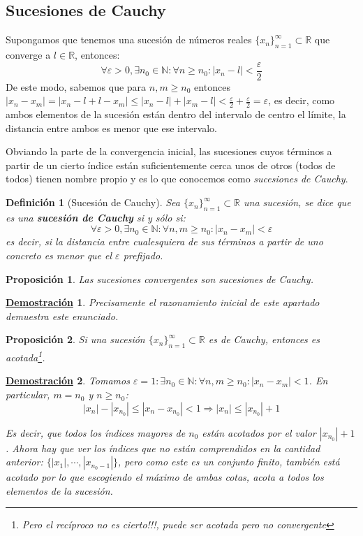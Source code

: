 \documentclass[10pt,a4paper,openright]{book}
\theoremstyle{break}
\newtheorem{defi}{Definición}[chapter]
\newtheorem{prop}{Proposición}[chapter]
\newtheorem*{demo}{\underline{Demostración}}
\begin{document}
\subsection{Sucesiones de Cauchy}
Supongamos que tenemos una sucesión de números reales $\{x_n\}_{n=1}^\infty\subset \mathbb R$ que converge a $l\in \mathbb R$, entonces:
$$\forall \varepsilon>0, \exists n_0\in \mathbb N: \forall n\geq n_0: |x_n-l|<\frac{\varepsilon}{2}$$
De este modo, sabemos que para $n,m\geq n_0$ entonces $|x_n-x_m|=|x_n-l+l-x_m|\leq |x_n-l|+|x_m-l|< \frac{\varepsilon}{2}+\frac{\varepsilon}{2}=\varepsilon$, es decir, como ambos elementos de la sucesión están dentro del intervalo de centro el límite, la distancia entre ambos es menor que ese intervalo.

Obviando la parte de la convergencia inicial, las sucesiones cuyos términos a partir de un cierto índice están suficientemente cerca unos de otros (todos de todos) tienen nombre propio y es lo que conocemos como \textit{sucesiones de Cauchy}.

\begin{defi}[Sucesión de Cauchy]
Sea $\{x_n\}_{n=1}^\infty\subset \mathbb R$ una sucesión, se dice que es una \textbf{sucesión de Cauchy} si y sólo si:
$$\forall \varepsilon>0, \exists n_0\in \mathbb N: \forall n,m\geq n_0: |x_n-x_m|<\varepsilon$$
es decir, si la distancia entre cualesquiera de sus términos a partir de uno concreto es menor que el $\varepsilon$ prefijado.
\end{defi}

\begin{prop}
Las sucesiones convergentes son sucesiones de Cauchy.
\end{prop}

\begin{demo}
Precisamente el razonamiento inicial de este apartado demuestra este enunciado.
\end{demo}

\begin{prop}
Si una sucesión $\{x_n\}_{n=1}^\infty\subset \mathbb R$ es de Cauchy, entonces es acotada\footnote{Pero el recíproco no es cierto!!!, puede ser acotada pero no convergente}.\par
\end{prop}
\begin{demo}
Tomamos $\varepsilon=1: \exists n_0\in \mathbb N: \forall n,m\geq n_0: |x_n-x_m|<1$. En particular, $m=n_0$ y $n\geq n_0$:
$$|x_n|-|x_{n_0}|\leq |x_n-x_{n_0}|<1\Rightarrow |x_n|\leq |x_{n_0}|+1$$

Es decir, que todos los índices mayores de $n_0$ están acotados por el valor $|x_{n_0}|+1$. Ahora hay que ver los índices que no están comprendidos en la cantidad anterior: $\{|x_1|, \cdots, |x_{n_0-1}|\}$, pero como este es un conjunto finito, también está acotado por lo que escogiendo el máximo de ambas cotas, acota a todos los elementos de la sucesión.
\end{demo}
\end{document}
